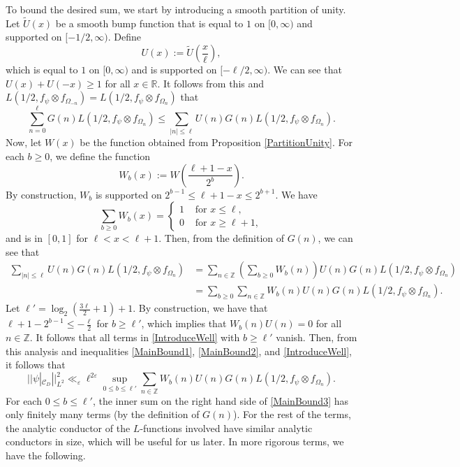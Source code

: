 \documentclass[11pt]{amsart}
\newcommand{\R}{\mathbb{R}}
\newcommand{\Z}{\mathbb{Z}}
\theoremstyle{definition}
\theoremstyle{remark}
\begin{document}
To bound the desired sum, we start by introducing a smooth partition of unity. Let $\widetilde{U}(x)$ be a smooth bump function that is equal to $1$ on $[0,\infty)$ and supported on $[-1/2,\infty)$. Define $$ U(x) := \widetilde{U}\left( \frac{x}{\ell} \right),$$ which is equal to $1$ on $[0,\infty)$ and is supported on $[-\ell/2,\infty)$. We can see that $U(x) + U(-x) \geq 1$ for all $x\in \R$. It follows from this and $L(1/2,f_{\psi}\otimes f_{\Omega_{-n}}) = L(1/2,f_{\psi} \otimes f_{\Omega_n})$ that 
\begin{equation}
    \sum_{n=0}^{\ell} G(n) L(1/2, f_{\psi}\otimes f_{\Omega_n}) \leq \sum_{|n|\leq \ell} U(n) G(n) L(1/2,f_{\psi} \otimes f_{\Omega_n}). \label{MainBound2}
\end{equation}
Now, let $W(x)$ be the function obtained from Proposition \ref{PartitionUnity}. For each $b\geq 0$, we define the function $$ W_{b}(x) := W\left( \frac{\ell+1-x}{2^{b}} \right).$$ By construction, $W_b$ is supported on $2^{b-1} \leq \ell+1-x \leq 2^{b+1}$. We have $$ \sum_{b\geq 0} W_{b}(x) = \left\{ \begin{array}{ll}
    1 & \text{ for } x\leq \ell, \\
    0 & \text{ for } x\geq \ell+1,
\end{array} \right.$$ and is in $[0,1]$ for $\ell<x<\ell+1$. Then, from the definition of $G(n)$, we can see that
\begin{align}
    \sum_{|n|\leq \ell} U(n) G(n) L(1/2,f_{\psi} \otimes f_{\Omega_n}) &= \sum_{n\in \Z} \left(\sum_{b\geq 0} W_{b}(n) \right)U(n) G(n) L(1/2,f_{\psi} \otimes f_{\Omega_n}) \nonumber \\
    &= \sum_{b\geq 0} \sum_{n\in \Z} W_{b}(n) U(n) G(n) L(1/2,f_{\psi}\otimes f_{\Omega_n}). \label{IntroduceWell}
\end{align}
Let $\ell' = \log_2\left(\frac{3\ell}{2}+1\right)+1$. By construction, we have that $\ell+1 - 2^{b-1} \leq -\frac{\ell}{2}$ for $b \geq \ell'$, which implies that $W_b(n) U(n)=0$ for all $n\in \Z$. It follows that all terms in \eqref{IntroduceWell} with $b\geq \ell'$ vanish. Then, from this analysis and inequalities \eqref{MainBound1}, \eqref{MainBound2}, and \eqref{IntroduceWell}, it follows that
\begin{equation}
    ||\psi|_{\mathcal{C}_{D}}||_{L^2}^{2} \ll_{\varepsilon} \ell^{2\varepsilon} \sup_{0\leq b \leq \ell'} \sum_{n\in \Z} W_{b}(n) U(n) G(n) L(1/2,f_{\psi}\otimes f_{\Omega_n}). \label{MainBound3}
\end{equation}
For each $0\leq b \leq \ell'$, the inner sum on the right hand side of \eqref{MainBound3} has only finitely many terms (by the definition of $G(n)$). For the rest of the terms, the analytic conductor of the $L$-functions involved have similar analytic conductors in size, which will be useful for us later. In more rigorous terms, we have the following.
\end{document}
